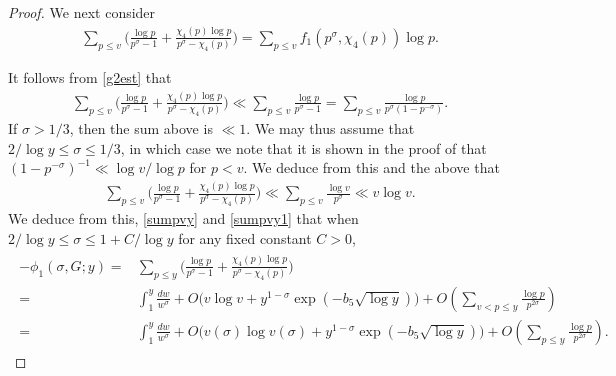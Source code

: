\documentclass[twoside,leqno,10pt, A4]{amsart}
\begin{document}
\begin{proof}
 We next consider
\begin{align*}
\sum_{p \leq v}\Big(\frac {\log p}{p^{\sigma}-1}+\frac {\chi_4(p)\log p}{p^{\sigma}-\chi_4(p)}\Big)=\sum_{p \leq v} f_1(p^{\sigma}, \chi_4(p))\log p.
\end{align*}  

  It follows from \eqref{g2est} that
\begin{align*}
\sum_{p \leq v}\Big(\frac {\log p}{p^{\sigma}-1}+\frac {\chi_4(p)\log p}{p^{\sigma}-\chi_4(p)}\Big) \ll  \sum_{p \leq v} \frac {\log p}{p^{\sigma}-1}=\sum_{p \leq v} \frac {\log p}{p^{\sigma}(1-p^{-\sigma})}.
\end{align*}   
 If $\sigma>1/3$, then the sum above is $\ll 1$. We may thus assume that $2/\log y \leq \sigma \leq 1/3$, in which case we note that it is shown in the proof of \cite[Lemma 7.5]{MVa1} that $(1-p^{-\sigma})^{-1} \ll \log v/\log p$ for $p<v$. We deduce from this and the above that
\begin{align*}
\sum_{p \leq v}\Big(\frac {\log p}{p^{\sigma}-1}+\frac {\chi_4(p)\log p}{p^{\sigma}-\chi_4(p)}\Big) \ll  \sum_{p \leq v} \frac {\log v}{p^{\sigma}} \ll v\log v.
\end{align*} 
  We deduce from this, \eqref{sumpvy} and \eqref{sumpvy1} that when $2/\log y \leq \sigma  \leq 1+C/\log y$ for any fixed constant $C>0$,
\begin{align}
\label{sumpvy3}
\begin{split}
 -\phi_1(\sigma, G;y)= & \sum_{p \leq y}\Big(\frac {\log p}{p^{\sigma}-1}+\frac {\chi_4(p)\log p}{p^{\sigma}-\chi_4(p)}\Big) \\
  =& \int^{y}_1\frac {dw}{w^{\sigma}}+ O\Big(v\log v+y^{1-\sigma}\exp(-b_5\sqrt{\log y})\Big)+O(\sum_{v<p \leq y}\frac {\log p}{p^{2\sigma}}) \\
  =& \int^{y}_1\frac {dw}{w^{\sigma}}+ O\Big(v(\sigma)\log v(\sigma)+y^{1-\sigma}\exp(-b_5\sqrt{\log y})\Big)+O(\sum_{p \leq y}\frac {\log p}{p^{2\sigma}}).
\end{split}
\end{align} 


\end{proof}
\end{document}
